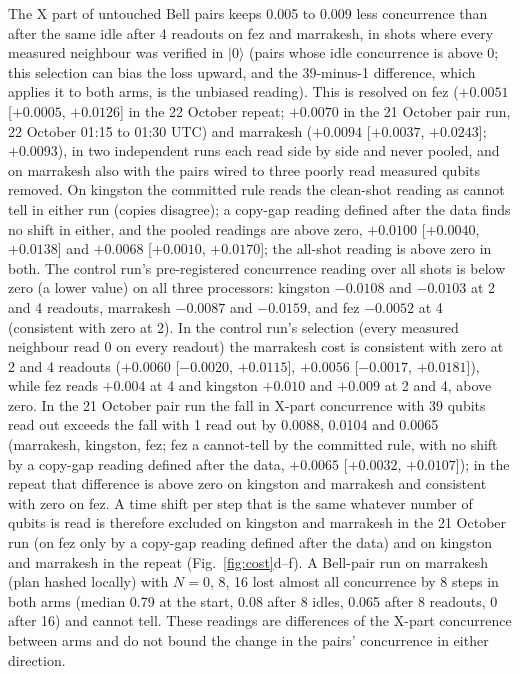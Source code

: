 \documentclass[reprint,amsmath,amssymb,aps,superscriptaddress,nofootinbib]{revtex4-2}
\begin{document}
The X part of untouched Bell pairs keeps 0.005 to 0.009 less concurrence than after the same idle after 4 readouts on fez and marrakesh, in shots where every measured neighbour was verified in $|0\rangle$ (pairs whose idle concurrence is above 0; this selection can bias the loss upward, and the 39-minus-1 difference, which applies it to both arms, is the unbiased reading). This is resolved on fez ($+0.0051$ [$+0.0005$, $+0.0126$] in the 22 October repeat; $+0.0070$ in the 21 October pair run, 22 October 01:15 to 01:30 UTC) and marrakesh ($+0.0094$ [$+0.0037$, $+0.0243$]; $+0.0093$), in two independent runs each read side by side and never pooled, and on marrakesh also with the pairs wired to three poorly read measured qubits removed. On kingston the committed rule reads the clean-shot reading as cannot tell in either run (copies disagree); a copy-gap reading defined after the data finds no shift in either, and the pooled readings are above zero, $+0.0100$ [$+0.0040$, $+0.0138$] and $+0.0068$ [$+0.0010$, $+0.0170$]; the all-shot reading is above zero in both. The control run's pre-registered concurrence reading over all shots is below zero (a lower value) on all three processors: kingston $-0.0108$ and $-0.0103$ at 2 and 4 readouts, marrakesh $-0.0087$ and $-0.0159$, and fez $-0.0052$ at 4 (consistent with zero at 2). In the control run's selection (every measured neighbour read 0 on every readout) the marrakesh cost is consistent with zero at 2 and 4 readouts ($+0.0060$ [$-0.0020$, $+0.0115$], $+0.0056$ [$-0.0017$, $+0.0181$]), while fez reads $+0.004$ at 4 and kingston $+0.010$ and $+0.009$ at 2 and 4, above zero. In the 21 October pair run the fall in X-part concurrence with 39 qubits read out exceeds the fall with 1 read out by 0.0088, 0.0104 and 0.0065 (marrakesh, kingston, fez; fez a cannot-tell by the committed rule, with no shift by a copy-gap reading defined after the data, $+0.0065$ [$+0.0032$, $+0.0107$]); in the repeat that difference is above zero on kingston and marrakesh and consistent with zero on fez. A time shift per step that is the same whatever number of qubits is read is therefore excluded on kingston and marrakesh in the 21 October run (on fez only by a copy-gap reading defined after the data) and on kingston and marrakesh in the repeat (Fig.~\ref{fig:cost}d--f). A Bell-pair run on marrakesh (plan hashed locally) with $N=0$, 8, 16 lost almost all concurrence by 8 steps in both arms (median 0.79 at the start, 0.08 after 8 idles, 0.065 after 8 readouts, 0 after 16) and cannot tell. These readings are differences of the X-part concurrence between arms and do not bound the change in the pairs' concurrence in either direction.
\end{document}
